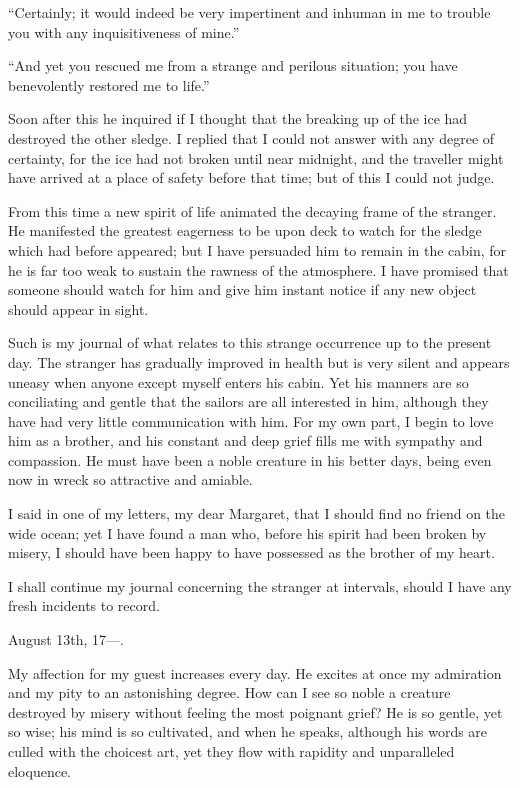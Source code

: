 \documentclass[12pt,openright]{book}
\begin{document}
“Certainly; it would indeed be very impertinent and inhuman in me to trouble you with any inquisitiveness of mine.”

“And yet you rescued me from a strange and perilous situation; you have benevolently restored me to life.”

Soon after this he inquired if I thought that the breaking up of the ice had destroyed the other sledge. I replied that I could not answer with any degree of certainty, for the ice had not broken until near midnight, and the traveller might have arrived at a place of safety before that time; but of this I could not judge.

From this time a new spirit of life animated the decaying frame of the stranger. He manifested the greatest eagerness to be upon deck to watch for the sledge which had before appeared; but I have persuaded him to remain in the cabin, for he is far too weak to sustain the rawness of the atmosphere. I have promised that someone should watch for him and give him instant notice if any new object should appear in sight.

Such is my journal of what relates to this strange occurrence up to the present day. The stranger has gradually improved in health but is very silent and appears uneasy when anyone except myself enters his cabin. Yet his manners are so conciliating and gentle that the sailors are all interested in him, although they have had very little communication with him. For my own part, I begin to love him as a brother, and his constant and deep grief fills me with sympathy and compassion. He must have been a noble creature in his better days, being even now in wreck so attractive and amiable.

I said in one of my letters, my dear Margaret, that I should find no friend on the wide ocean; yet I have found a man who, before his spirit had been broken by misery, I should have been happy to have possessed as the brother of my heart.

I shall continue my journal concerning the stranger at intervals, should I have any fresh incidents to record.

August 13th, 17—.

My affection for my guest increases every day. He excites at once my admiration and my pity to an astonishing degree. How can I see so noble a creature destroyed by misery without feeling the most poignant grief? He is so gentle, yet so wise; his mind is so cultivated, and when he speaks, although his words are culled with the choicest art, yet they flow with rapidity and unparalleled eloquence.
\end{document}
